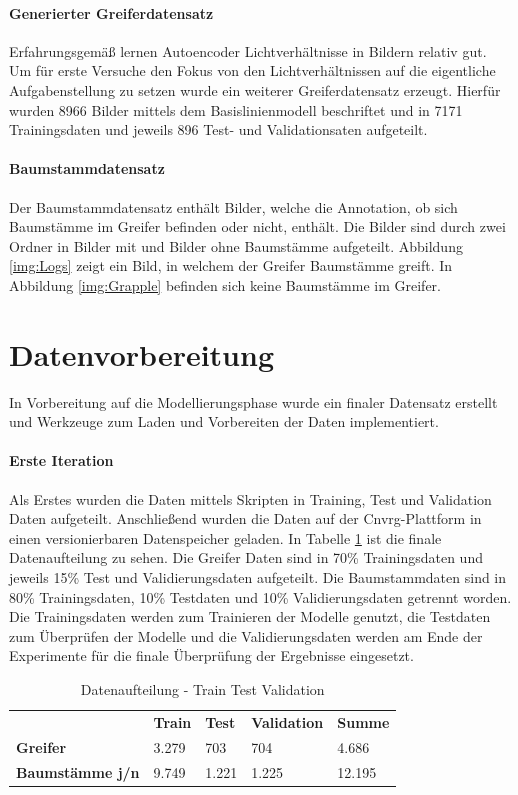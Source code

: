 	\paragraph{Generierter Greiferdatensatz}  Erfahrungsgemäß lernen Autoencoder Lichtverhältnisse in Bildern relativ gut. Um für erste Versuche den Fokus von den Lichtverhältnissen auf die eigentliche Aufgabenstellung zu setzen wurde ein weiterer Greiferdatensatz erzeugt. Hierfür wurden 8966 Bilder mittels dem Basislinienmodell beschriftet und in 7171 Trainingsdaten und jeweils 896 Test- und Validationsaten aufgeteilt.
	 
	\paragraph{Baumstammdatensatz} Der Baumstammdatensatz enthält Bilder, welche die Annotation, ob sich Baumstämme im Greifer befinden oder nicht, enthält. Die Bilder sind durch zwei Ordner in Bilder mit und Bilder ohne Baumstämme aufgeteilt. Abbildung \ref{img:Logs} zeigt ein Bild, in welchem der Greifer Baumstämme greift. In Abbildung \ref{img:Grapple} befinden sich keine Baumstämme im Greifer.  
			
	\section{Datenvorbereitung}
	\label{sec:DataPreparation}
	In Vorbereitung auf die Modellierungsphase wurde ein finaler Datensatz erstellt und Werkzeuge zum Laden und Vorbereiten der Daten implementiert.
	\paragraph{Erste Iteration} Als Erstes wurden die Daten mittels Skripten in Training, Test und Validation Daten aufgeteilt. Anschließend wurden die Daten auf der Cnvrg-Plattform in einen versionierbaren Datenspeicher geladen. In Tabelle \ref{table:DatenaufteilungTrainTestValidation} ist die finale Datenaufteilung zu sehen. Die Greifer Daten sind in 70\% Trainingsdaten und jeweils 15\% Test und Validierungsdaten aufgeteilt. Die Baumstammdaten sind in 80\% Trainingsdaten, 10\% Testdaten und 10\% Validierungsdaten getrennt worden. Die Trainingsdaten werden zum Trainieren der Modelle genutzt, die Testdaten zum Überprüfen der Modelle und die Validierungsdaten werden am Ende der Experimente für die finale Überprüfung der Ergebnisse eingesetzt.
	\begin{table}[ht]
		\centering
		\begin{tabularx}{\textwidth}{lllll}
			& \textbf{Train} & \textbf{Test}  & \textbf{Validation} & \textbf{Summe} 	 \\
			\textbf{Greifer} 				 & 	3.279			& 703	 & 704				   & 4.686 	\\
			\textbf{Baumstämme j/n}	 	  &  9.749	   & 1.221 	& 1.225	& 12.195\\		
		\end{tabularx}
		\caption{Datenaufteilung - Train Test Validation}
		\label{table:DatenaufteilungTrainTestValidation}
	\end{table}
	
